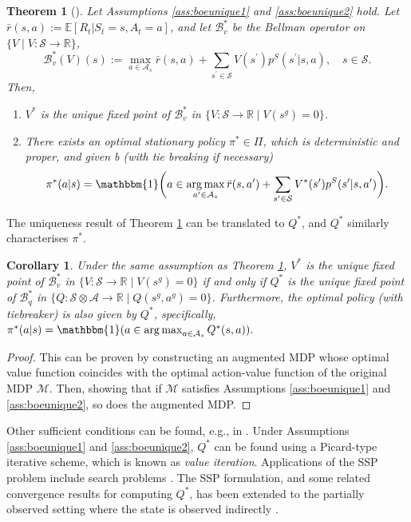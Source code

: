 \documentclass{amsart}
\newtheorem{theorem}{Theorem}[]
\newtheorem{corollary}{Corollary}
\DeclareMathOperator*{\argmax}{arg\,max}
\begin{document}
\begin{theorem}[\cite{bertseka1991}]
    Let Assumptions \ref{ass:boeunique1} and \ref{ass:boeunique2} hold. Let $\bar{r}(s,a):=\mathbb{E}[R_t|S_t=s,A_t=a]$, and let $\mathcal{B}_v^*$ be the {\it Bellman} operator on $\{V\mid V:\mathcal{S} \rightarrow \mathbb{R}\}$,
    \begin{equation*}
    \mathcal{B}_v^*(V)(s) := \max_{a \in \mathcal{A}_s} \bar{r}(s,a)+ \sum_{s^\prime \in \mathcal{S}} V(s^\prime) p^S(s^\prime|s,a),\quad s \in \mathcal{S}. 
    \end{equation*}Then, 
    \begin{enumerate}
        \item 
        $V^*$ is the unique fixed point of $\mathcal{B}_v^*$ in $\{V:\mathcal{S} \rightarrow \mathbb{R} \mid V(s^g) = 0\}$.

    \item There exists an optimal stationary policy $\pi^* \in \Pi$, which is deterministic and proper, and given b (with tie breaking if necessary)
    \begin{equation*}
        \pi^*(a|s) = \mathbbm{1}\bigg(a \in \argmax_{a^\prime \in \mathcal{A}_s} \bar{r}(s,a^\prime) + \sum_{s^\prime \in \mathcal{S}} V^*(s^\prime)p^S(s^\prime|s,a^\prime) \bigg) .
    \end{equation*}
    \end{enumerate}
\label{thmvunique}
\end{theorem}
The uniqueness result of Theorem \ref{thmvunique} can be translated to $Q^*$, and $Q^*$ similarly characterises $\pi^\ast$.
\begin{corollary}
     Under the same assumption as Theorem \ref{thmvunique}, $V^*$ is the unique fixed point of $\mathcal{B}_v^*$ in $\{V:\mathcal{S} \rightarrow \mathbb{R}\mid V(s^g)=0\}$ if and only if $Q^*$ is the unique fixed point of $\mathcal{B}^*_q$ in $\{Q:\mathcal{S} \otimes \mathcal{A} \rightarrow \mathbb{R}\mid Q(s^g,a^g)=0\}$. Furthermore, the optimal policy (with tiebreaker) is also given by $Q^*$, specifically, $\pi^*(a|s) = \mathbbm{1}(a \in \argmax_{a \in \mathcal{A}_s}Q^*(s,a)).$\label{cor:qvuniqueness}
\end{corollary}
\begin{proof}

 This can be proven by constructing an augmented MDP \citep[p. 186]{bertsekas2019} whose optimal value function coincides with the optimal action-value function of the original MDP $\mathcal{M}$. Then, showing that if $\mathcal{M}$ satisfies Assumptions \ref{ass:boeunique1} and \ref{ass:boeunique2}, so does the augmented MDP.
\end{proof}
Other sufficient conditions can be found, e.g., in \citet{bertseka1991,putermanrl,bertsekas2019,ssppolyhedral}. Under  Assumptions \ref{ass:boeunique1} and \ref{ass:boeunique2}, $Q^\ast$ can be found using a Picard-type iterative scheme, which is known as {\it value iteration}. Applications of the SSP problem include search problems \citep{ssp_eagle}. The SSP formulation, and some related convergence results for computing $Q^\ast$, has been extended to the partially observed setting where the state is observed indirectly \citep{ssp_patek, ssp_appl_singh}.
\end{document}
